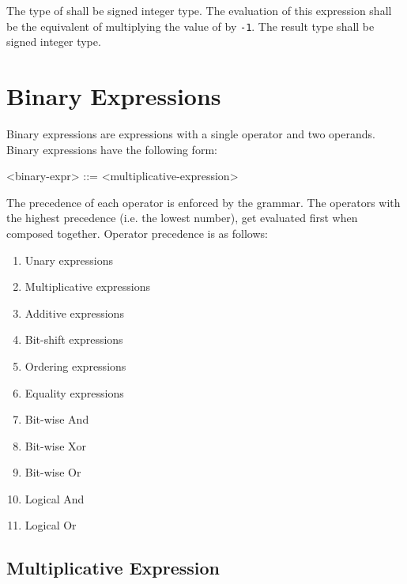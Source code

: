 The type of  shall be signed integer type. The evaluation of this expression shall be the equivalent of multiplying the value of  by \texttt{-1}. The result type shall be signed integer type.

\section{Binary Expressions} \label{guide:binary_expr}

Binary expressions are expressions with a single operator and two operands. Binary expressions have the following form:

\begin{minip}
\begin{grammar}
<binary-expr> ::= <multiplicative-expression>
\end{grammar}
\end{minip}

The precedence of each operator is enforced by the grammar. The operators with the highest precedence (i.e. the lowest number), get evaluated first when composed together. Operator precedence is as follows:

\begin{enumerate}
\singlespacing
\item Unary expressions
\item Multiplicative expressions
\item Additive expressions
\item Bit-shift expressions
\item Ordering expressions
\item Equality expressions
\item Bit-wise And
\item Bit-wise Xor
\item Bit-wise Or
\item Logical And
\item Logical Or
\end{enumerate}

\subsection{Multiplicative Expression} \label{guide:mult_expr}

